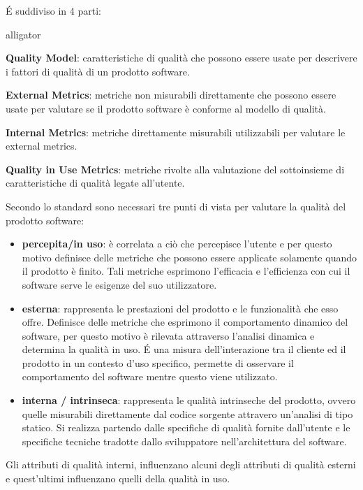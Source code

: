 É suddiviso in 4 parti:
\begin{labeling}{alligator}
	\item \textbf{Quality Model}: caratteristiche di qualità che possono essere usate per descrivere i fattori di qualità di un prodotto software.
	\item \textbf{External Metrics}: metriche non misurabili direttamente che possono essere usate per valutare se il prodotto software è conforme al modello di qualità.
	\item \textbf{Internal Metrics}: metriche direttamente misurabili utilizzabili per valutare le external metrics.
	\item \textbf{Quality in Use Metrics}: metriche rivolte alla valutazione del sottoinsieme di caratteristiche di qualità legate all’utente.
\end{labeling}

Secondo lo standard sono necessari tre punti di vista per valutare la qualità del prodotto software:
\begin{itemize}
	\item \textbf{percepita/in uso}: è correlata a ciò che percepisce l'utente e per questo motivo definisce delle metriche che possono essere applicate solamente quando il prodotto è finito. Tali metriche esprimono l'efficacia e l'efficienza con cui il software serve le esigenze del suo utilizzatore. 
	 
	\item \textbf{esterna}: rappresenta le prestazioni del prodotto e le funzionalità che esso offre. Definisce delle metriche che esprimono il comportamento dinamico del software, per questo motivo è rilevata attraverso l'analisi dinamica e determina la qualità in uso. É una misura dell'interazione tra il cliente ed il prodotto in un contesto d'uso specifico, permette di osservare il comportamento del software mentre questo viene utilizzato. 
	
	\item \textbf{interna / intrinseca}: rappresenta le qualità intrinseche del prodotto, ovvero quelle misurabili direttamente dal codice sorgente attravero un'analisi di tipo statico. Si realizza partendo dalle specifiche di qualità fornite dall'utente e le specifiche tecniche tradotte dallo sviluppatore nell'architettura del software.
\end{itemize}

Gli attributi di qualità interni, influenzano alcuni degli attributi di qualità esterni e quest'ultimi influenzano quelli della qualità in uso.

